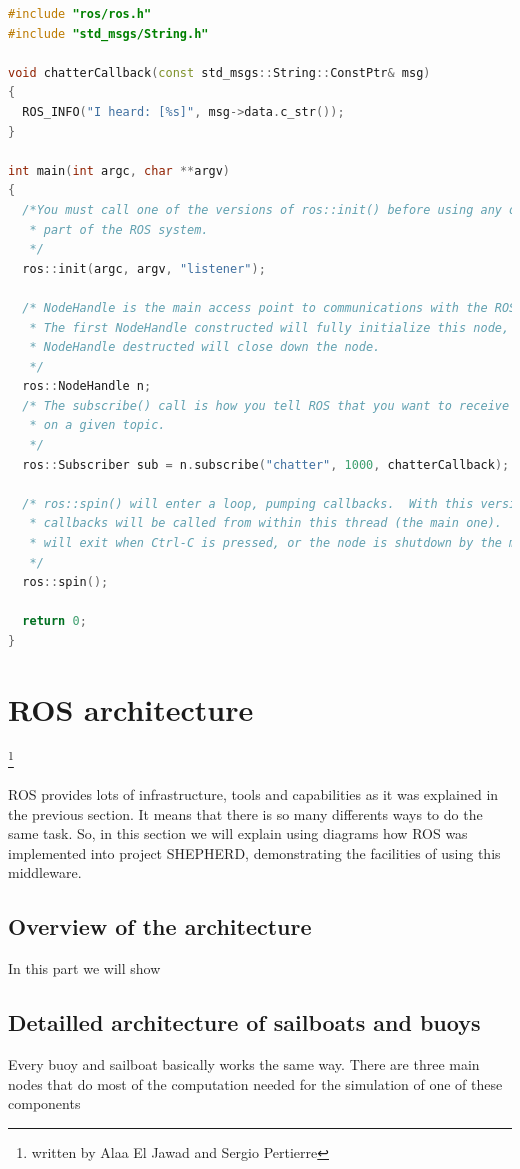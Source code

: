 \documentclass[a4paper]{report}
\begin{document}
\renewcommand{\lstlistingname}{Code}
\begin{lstlisting}[language=C++, caption={Simple Subscriber}, frame=single]
#include "ros/ros.h"
#include "std_msgs/String.h"

void chatterCallback(const std_msgs::String::ConstPtr& msg)
{
  ROS_INFO("I heard: [%s]", msg->data.c_str());
}

int main(int argc, char **argv)
{
  /*You must call one of the versions of ros::init() before using any other
   * part of the ROS system.
   */
  ros::init(argc, argv, "listener");

  /* NodeHandle is the main access point to communications with the ROS system.
   * The first NodeHandle constructed will fully initialize this node, and the last
   * NodeHandle destructed will close down the node.
   */
  ros::NodeHandle n;
  /* The subscribe() call is how you tell ROS that you want to receive messages
   * on a given topic.
   */
  ros::Subscriber sub = n.subscribe("chatter", 1000, chatterCallback);

  /* ros::spin() will enter a loop, pumping callbacks.  With this version, all
   * callbacks will be called from within this thread (the main one).  ros::spin()
   * will exit when Ctrl-C is pressed, or the node is shutdown by the master.
   */
  ros::spin();

  return 0;
}
\end{lstlisting}
\section{ROS architecture}
	\footnote{written by Alaa El Jawad and Sergio Pertierre}
    
ROS provides lots of infrastructure, tools and capabilities as it was explained in the previous section. It means that there is so many differents ways to do the same task. So, in this section we will explain using diagrams how ROS was implemented into project SHEPHERD, demonstrating the facilities of using this middleware.
\subsection{Overview of the architecture}
	In this part we will show
\subsection{Detailled architecture of sailboats and buoys}

Every buoy and sailboat basically works the same way. There are three main nodes that do most of the computation needed for the simulation of one of these components
    
\end{document}
